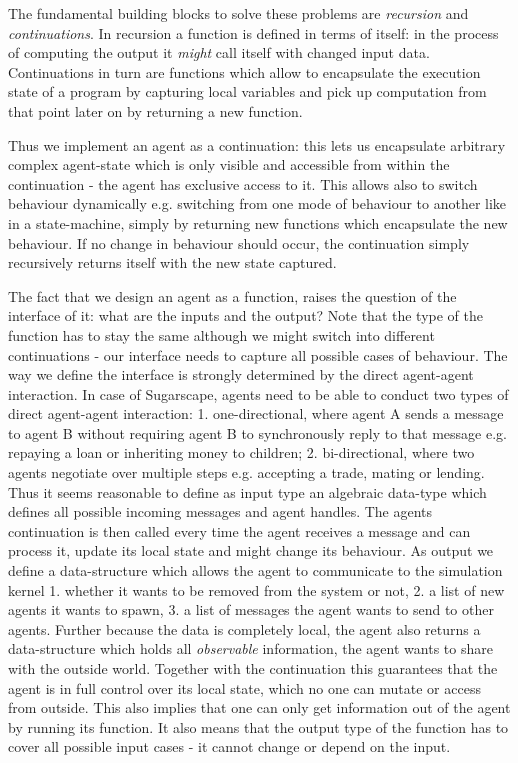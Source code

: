 The fundamental building blocks to solve these problems are \textit{recursion} and \textit{continuations}. In recursion a function is defined in terms of itself: in the process of computing the output it \textit{might} call itself with changed input data. Continuations in turn are functions which allow to encapsulate the execution state of a program by capturing local variables and pick up computation from that point later on by returning a new function.

Thus we implement an agent as a continuation: this lets us encapsulate arbitrary complex agent-state which is only visible and accessible from within the continuation - the agent has exclusive access to it. This allows also to switch behaviour dynamically e.g. switching from one mode of behaviour to another like in a state-machine, simply by returning new functions which encapsulate the new behaviour. If no change in behaviour should occur, the continuation simply recursively returns itself with the new state captured.

The fact that we design an agent as a function, raises the question of the interface of it: what are the inputs and the output? Note that the type of the function has to stay the same although we might switch into different continuations - our interface needs to capture all possible cases of behaviour. The way we define the interface is strongly determined by the direct agent-agent interaction. In case of Sugarscape, agents need to be able to conduct two types of direct agent-agent interaction: 1. one-directional, where agent A sends a message to agent B without requiring agent B to synchronously reply to that message e.g. repaying a loan or inheriting money to children; 2. bi-directional, where two agents negotiate over multiple steps e.g. accepting a trade, mating or lending.
Thus it seems reasonable to define as input type an algebraic data-type which defines all possible incoming messages and agent handles. The agents continuation is then called every time the agent receives a message and can process it, update its local state and might change its behaviour.
As output we define a data-structure which allows the agent to communicate to the simulation kernel 1. whether it wants to be removed from the system or not, 2. a list of new agents it wants to spawn, 3. a list of messages the agent wants to send to other agents. Further because the data is completely local, the agent also returns a data-structure which holds all \textit{observable} information, the agent wants to share with the outside world. Together with the continuation this guarantees that the agent is in full control over its local state, which no one can mutate or access from outside. This also implies that one can only get information out of the agent by running its function. It also means that the output type of the function has to cover all possible input cases - it cannot change or depend on the input. 

